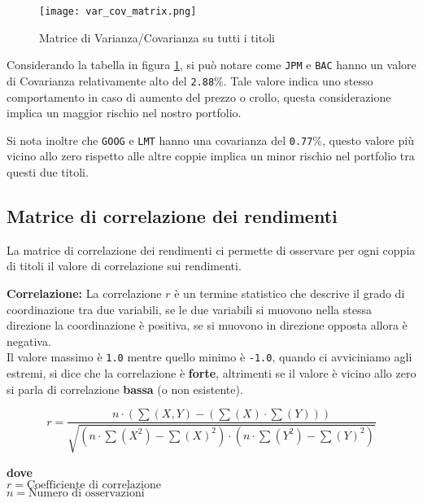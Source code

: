 \begin{figure}[h]
  \centering
  \texttt{[image: var\_cov\_matrix.png]}
  \caption{Matrice di Varianza/Covarianza su tutti i titoli}
  \label{fig:var_cov_matrix}
\end{figure}

Considerando la tabella in figura \ref{fig:var_cov_matrix}, si può notare come \verb|JPM| e \verb|BAC| hanno un valore di Covarianza
relativamente alto del \verb|2.88|\%. Tale valore indica uno stesso comportamento in caso di aumento del prezzo o crollo, questa considerazione implica
un maggior rischio nel nostro portfolio.

Si nota inoltre che \verb|GOOG| e \verb|LMT| hanno una covarianza del \verb|0.77|\%, questo valore più vicino allo zero rispetto alle altre coppie implica
un minor rischio nel portfolio tra questi due titoli.


\subsection{Matrice di correlazione dei rendimenti}

La matrice di correlazione dei rendimenti ci permette di osservare per ogni coppia di titoli il valore di correlazione sui rendimenti.

\textbf{Correlazione:} La correlazione \(r\) è un termine statistico che descrive il grado di coordinazione tra due variabili, se le due variabili si muovono nella stessa direzione
la coordinazione è positiva, se si muovono in direzione opposta allora è negativa.\\
Il valore massimo è \verb|1.0| mentre quello minimo è \verb|-1.0|, quando ci avviciniamo agli estremi, si dice che la correlazione è \textbf{forte}, altrimenti se il valore è vicino allo zero si parla di correlazione \textbf{bassa} (o non esistente).

\begin{displaymath}
  r = \frac{n \cdot (\sum (X, Y) - (\sum (X) \cdot \sum (Y)))}
  {\sqrt{(n \cdot \sum(X^2) - \sum (X)^2) \cdot (n \cdot \sum (Y^2) - \sum (Y)^2)}}
\end{displaymath}

\textbf{dove}\\
\(r = \text{Coefficiente di correlazione}\)\\
\(n = \text{Numero di osservazioni}\)

